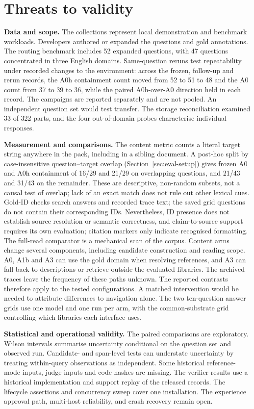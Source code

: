\section{Threats to validity}
\label{sec:threats}

\noindent\textbf{Data and scope.} The collections represent local
demonstration and benchmark workloads. Developers authored or expanded the
questions and gold annotations. The routing benchmark includes 52 expanded
questions, with 47 questions concentrated in three English domains.
Same-question reruns test repeatability under recorded changes to the
environment: across the frozen, follow-up and rerun records, the A0h
containment count moved from 52 to 51 to 48 and the A0 count from 37 to
39 to 36, while the paired A0h-over-A0 direction held in each record.
The campaigns are reported separately and are not pooled. An independent
question set would test transfer. The storage
reconciliation examined 33 of 322 parts, and the four out-of-domain probes
characterise individual responses.

\noindent\textbf{Measurement and comparisons.} The content metric counts a
literal target string anywhere in the pack, including in a sibling
document. A post-hoc split by case-insensitive question--target overlap
(Section~\ref{sec:eval-setup}) gives frozen A0 and A0h containment of
16/29 and 21/29 on overlapping questions, and 21/43 and 31/43 on the
remainder. These are descriptive, non-random subsets, not a causal test of
overlap; lack of an exact match does not rule out other lexical cues.
Gold-ID checks search answers and recorded trace text; the saved grid
questions do not contain their corresponding IDs. Nevertheless, ID presence
does not establish source resolution or semantic correctness, and
claim-to-source support requires its own evaluation; citation markers only
indicate recognised formatting. The full-read comparator is a mechanical
scan of the corpus. Content arms change several components, including candidate
construction and reading scope. A0, A1b and A3 can use the gold domain when
resolving references, and A3 can fall back to descriptions or retrieve
outside the evaluated libraries. The archived traces leave the frequency of
these paths unknown. The reported contrasts therefore apply to the tested
configurations. A matched intervention would be needed to attribute
differences to navigation alone. The two ten-question answer grids use one
model and one run per arm, with the common-substrate grid controlling which
libraries each interface uses.

\noindent\textbf{Statistical and operational validity.} The paired
comparisons are exploratory. Wilson intervals summarise uncertainty
conditional on the question set and observed run. Candidate- and span-level
tests can understate uncertainty by treating within-query observations as
independent. Some historical reference-mode inputs, judge inputs and code
hashes are missing. The verifier results use a historical implementation
and support replay of the released records. The lifecycle assertions and
concurrency sweep cover one installation. The experience approval path,
multi-host reliability, and crash recovery remain open.
